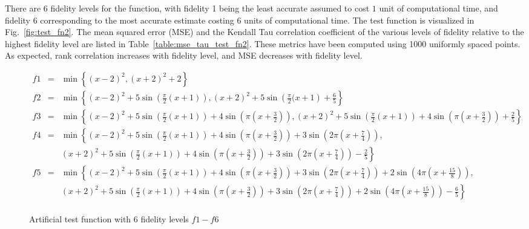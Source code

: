 There are $6$ fidelity levels for the function, with fidelity 1 being the least accurate assumed to cost $1$ unit of computational time, and fidelity 6 corresponding to the most accurate estimate costing $6$ units of computational time. The test function is visualized in  Fig.~\ref{fig:test_fn2}.  The mean squared error (MSE) and the Kendall Tau correlation coefficient of the various levels of fidelity relative to the highest fidelity level are listed in Table~\ref{table:mse_tau_test_fn2}. These metrics have been computed using 1000 uniformly spaced points. As expected, rank correlation increases with fidelity level, and MSE decreases with fidelity level.
\begin{figure*}[!t]
	\caption{Artificial test function with 6 fidelity levels $f1-f6$}
	\begin{footnotesize}
		\begin{eqnarray}
		f1&=&\min\left\{(x-2)^2,(x+2)^2+2\right\}\\
		f2&=&\min\left\{(x-2)^2+5\sin\left(\frac{\pi}{2}(x+1)\right),(x+2)^2+5\sin\left(\frac{\pi}{2}(x+1\right)+\frac{6}{5}\right\}\\
		f3&=&\min\left\{(x-2)^2+5\sin\left(\frac{\pi}{2}(x+1)\right)+4\sin\left(\pi(x+\frac{3}{2})\right),(x+2)^2+5\sin\left(\frac{\pi}{2}(x+1)\right)+4\sin\left(\pi(x+\frac{3}{2})\right)+\frac{2}{5}\right\}\\
		f4&=&\min\left\{(x-2)^2+5\sin\left(\frac{\pi}{2}(x+1)\right)+4\sin\left(\pi(x+\frac{3}{2})\right)+3\sin\left(2\pi(x+\frac{7}{4})\right),\right.\\
		&&\left. (x+2)^2+5\sin\left(\frac{\pi}{2}(x+1)\right)+4\sin\left(\pi(x+\frac{3}{2})\right)+3\sin\left(2\pi(x+\frac{7}{4})\right)-\frac{2}{5}\right\}\\
		f5&=&\min\left\{(x-2)^2+5\sin\left(\frac{\pi}{2}(x+1)\right)+4\sin\left(\pi(x+\frac{3}{2})\right)+3\sin\left(2\pi(x+\frac{7}{4})\right)+2\sin\left(4\pi(x+\frac{15}{8})\right),\right. \\
		&&\left. (x+2)^2+5\sin\left(\frac{\pi}{2}(x+1)\right)+4\sin\left(\pi(x+\frac{3}{2})\right)+3\sin\left(2\pi(x+\frac{7}{4})\right)+2\sin\left(4\pi(x+\frac{15}{8})\right)-\frac{6}{5}\right\}\\

\end{eqnarray}
\end{footnotesize}
\end{figure*}
